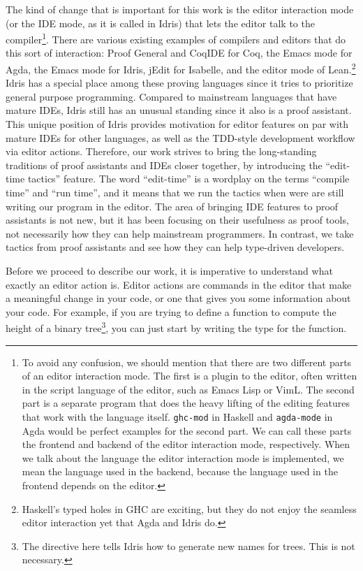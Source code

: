The kind of change that is important for this work is the editor
interaction mode (or the IDE mode, as it is called in Idris\cite{idris}) that
lets the editor talk to the compiler\footnote{To avoid any confusion,
we should mention that there are two different parts of an editor interaction
mode. The first is a plugin to the editor, often written in the script language
of the editor, such as Emacs Lisp or VimL. The second part is a separate
program that does the heavy lifting of the editing features that work with the
language itself.  \texttt{ghc-mod} in Haskell and \texttt{agda-mode} in Agda would
be perfect examples for the second part. We can call these parts the frontend
and backend of the editor interaction mode, respectively.  When we talk about
the language the editor interaction mode is implemented, we mean the language
used in the backend, because the language used in the frontend depends on the
editor.}.
There are various existing examples of compilers and editors that do this sort
of interaction:
Proof General\cite{pg} and CoqIDE for Coq\cite{coq},
the Emacs mode\cite{agdamode} for Agda,
the Emacs mode\cite{idrismode} for Idris,
jEdit\cite{isabellejedit} for Isabelle,
and the editor mode of Lean\cite{lean}.\footnote{Haskell's typed holes in GHC
are exciting, but they do not enjoy the seamless editor interaction yet that
Agda and Idris do.}
Idris has a special place among these proving languages since it tries to
prioritize general purpose programming. Compared to mainstream languages
that have mature IDEs, Idris still has an unusual standing since it also is a
proof assistant.\cite{idrisfaq}
This unique position of Idris provides motivation for editor features on par
with mature IDEs for other languages, as well as the TDD-style development
workflow via editor actions.
Therefore, our work strives to bring the long-standing traditions of proof
assistants and IDEs closer together, by introducing the ``edit-time tactics''
feature.  The word ``edit-time'' is a wordplay on the terms ``compile time''
and ``run time'', and it means that we run the tactics when were are still
writing our program in the editor.
The area of bringing IDE features to proof assistants is not new\cite{ctcoq,
developingReuse, realTheoremProvers, toolSupport}, but it has been focusing
on their usefulness as proof tools, not necessarily how they can help
mainstream programmers. In contrast, we take tactics from proof assistants
and see how they can help type-driven developers.

Before we proceed to describe our work,
it is imperative to understand what exactly an editor action is.
Editor actions are commands in the editor that make a meaningful
change in your code, or one that gives you some information about your
code. For example, if you are trying to define a function to compute the height
of a binary tree\footnote{The \texttt{} directive here tells
Idris how to generate new names for trees. This is not necessary.}, you can
just start by writing the type for the function.

